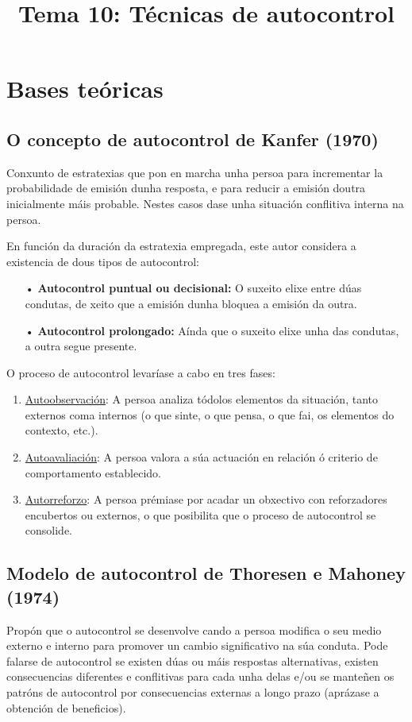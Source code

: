 \documentclass[a4paper,11pt]{article}
\title{Tema 10: Técnicas de autocontrol}
\date{}
\begin{document}
   

\maketitle 

\section{Bases teóricas}
\subsection{O concepto de autocontrol de Kanfer (1970)}
Conxunto de estratexias que pon en marcha unha persoa para incrementar la probabilidade de emisión dunha resposta, e para reducir a emisión doutra inicialmente máis probable. Nestes casos dase unha
situación conflitiva interna na persoa.

En función da duración da estratexia empregada, este autor considera a existencia de dous tipos de autocontrol:
\begin{itemize}
	\item[•] \textbf{Autocontrol puntual ou decisional:} O suxeito elixe entre dúas condutas, de 
	xeito que a emisión dunha bloquea a emisión da outra.
	\item[•] \textbf{Autocontrol prolongado:} Aínda que o suxeito elixe unha das condutas, a outra 
	segue presente. 
\end{itemize}

O proceso de autocontrol levaríase a cabo en tres fases:
\begin{enumerate}
	\item \underline{Autoobservación}: A persoa analiza tódolos elementos da situación, tanto 
	externos coma internos (o que sinte, o que pensa, o que fai, os elementos do contexto, etc.).
	\item \underline{Autoavaliación}: A persoa valora a súa actuación en relación ó criterio de
	comportamento establecido.
	\item \underline{Autorreforzo}: A persoa prémiase por acadar un obxectivo con reforzadores
	encubertos ou externos, o que posibilita que o proceso de autocontrol se consolide.
\end{enumerate}

\subsection{Modelo de autocontrol de Thoresen e Mahoney (1974)}
Propón que o autocontrol se desenvolve cando a persoa modifica o seu medio externo e interno para promover un cambio significativo na súa conduta. Pode falarse de autocontrol se existen dúas ou máis respostas alternativas, existen consecuencias diferentes e conflitivas para cada unha delas e/ou se manteñen os patróns de autocontrol por consecuencias externas a longo prazo (aprázase a obtención de beneficios). 
\end{document}
